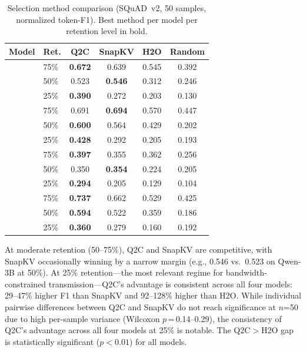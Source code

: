 \documentclass[conference]{IEEEtran}
\newcommand{\QtoC}{\textsc{Q2C}\xspace}
\begin{document}
\begin{table}[t]
\centering
\caption{Selection method comparison (SQuAD~v2, 50 samples, normalized token-F1). Best method per model per retention level in bold.}
\label{tab:selection}
\small
\begin{tabular}{@{}llcccc@{}}
\toprule
\textbf{Model} & \textbf{Ret.} & \textbf{\QtoC} & \textbf{SnapKV} & \textbf{H2O} & \textbf{Random} \\
\midrule
{}
  & 75\% & \textbf{0.672} & 0.639 & 0.545 & 0.392 \\
  & 50\% & 0.523 & \textbf{0.546} & 0.312 & 0.246 \\
  & 25\% & \textbf{0.390} & 0.272 & 0.203 & 0.130 \\
\midrule
{}
  & 75\% & 0.691 & \textbf{0.694} & 0.570 & 0.447 \\
  & 50\% & \textbf{0.600} & 0.564 & 0.429 & 0.202 \\
  & 25\% & \textbf{0.428} & 0.292 & 0.205 & 0.193 \\
\midrule
{}
  & 75\% & \textbf{0.397} & 0.355 & 0.362 & 0.256 \\
  & 50\% & 0.350 & \textbf{0.354} & 0.224 & 0.205 \\
  & 25\% & \textbf{0.294} & 0.205 & 0.129 & 0.104 \\
\midrule
{}
  & 75\% & \textbf{0.737} & 0.662 & 0.529 & 0.425 \\
  & 50\% & \textbf{0.594} & 0.522 & 0.359 & 0.186 \\
  & 25\% & \textbf{0.360} & 0.279 & 0.160 & 0.192 \\
\bottomrule
\end{tabular}
\end{table}

At moderate retention (50--75\%), \QtoC and SnapKV are competitive, with SnapKV occasionally winning by a narrow margin (e.g., 0.546 vs.\ 0.523 on Qwen-3B at 50\%).
At 25\% retention---the most relevant regime for bandwidth-constrained transmission---\QtoC's advantage is consistent across all four models: 29--47\% higher F1 than SnapKV and 92--128\% higher than H2O.
While individual pairwise differences between \QtoC and SnapKV do not reach significance at $n$=50 due to high per-sample variance (Wilcoxon $p$\,=\,0.14--0.29), the consistency of \QtoC's advantage across all four models at 25\% is notable.
The Q2C$>$H2O gap is statistically significant ($p < 0.01$) for all models.
\end{document}
